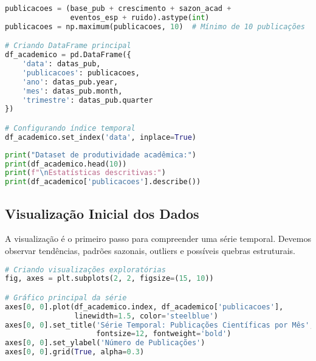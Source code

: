\begin{pythonbox}
\begin{lstlisting}[language=Python]
publicacoes = (base_pub + crescimento + sazon_acad + 
               eventos_esp + ruido).astype(int)
publicacoes = np.maximum(publicacoes, 10)  # Mínimo de 10 publicações

# Criando DataFrame principal
df_academico = pd.DataFrame({
    'data': datas_pub,
    'publicacoes': publicacoes,
    'ano': datas_pub.year,
    'mes': datas_pub.month,
    'trimestre': datas_pub.quarter
})

# Configurando índice temporal
df_academico.set_index('data', inplace=True)
\end{lstlisting}
\end{pythonbox}

\begin{pythonbox}
\begin{lstlisting}[language=Python]
print("Dataset de produtividade acadêmica:")
print(df_academico.head(10))
print(f"\nEstatísticas descritivas:")
print(df_academico['publicacoes'].describe())
\end{lstlisting}
\end{pythonbox}

\subsection{Visualização Inicial dos Dados}

A visualização é o primeiro passo para compreender uma série temporal. Devemos observar tendências, padrões sazonais, outliers e possíveis quebras estruturais.

\begin{pythonbox}
\begin{lstlisting}[language=Python]
# Criando visualizações exploratórias
fig, axes = plt.subplots(2, 2, figsize=(15, 10))

# Gráfico principal da série
axes[0, 0].plot(df_academico.index, df_academico['publicacoes'], 
                linewidth=1.5, color='steelblue')
axes[0, 0].set_title('Série Temporal: Publicações Científicas por Mês', 
                     fontsize=12, fontweight='bold')
axes[0, 0].set_ylabel('Número de Publicações')
axes[0, 0].grid(True, alpha=0.3)
\end{lstlisting}
\end{pythonbox}

